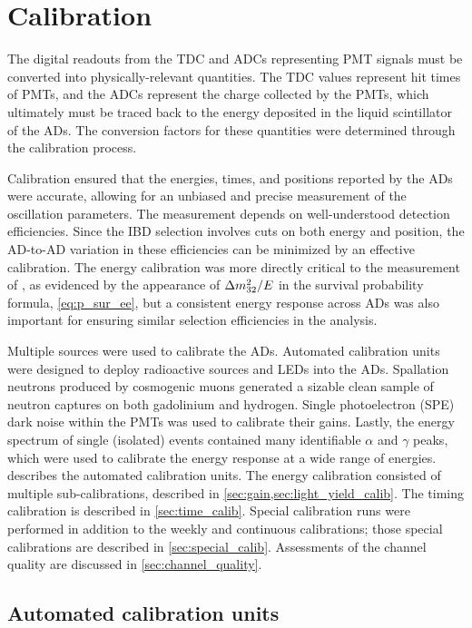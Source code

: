 \chapter{Calibration}
\label{ch:calibration}


The digital readouts from the TDC and ADCs representing PMT signals
must be converted into physically-relevant quantities.
The TDC values represent hit times of PMTs,
and the ADCs represent the charge collected by the PMTs,
which ultimately must be traced back to the energy deposited
in the liquid scintillator of the ADs.
The conversion factors for these quantities were determined
through the calibration process.

Calibration ensured that the energies, times, and positions
reported by the ADs were accurate,
allowing for an unbiased and precise measurement
of the oscillation parameters.
The \thetaot{} measurement depends on well-understood detection efficiencies.
Since the IBD selection involves cuts on both energy and position,
the AD-to-AD variation in these efficiencies can be minimized
by an effective calibration.
The energy calibration was more directly critical to the measurement
of \dmsquared{}, as evidenced by the appearance of $\Delta m^2_{32}/E$
in the survival probability formula, \cref{eq:p_sur_ee},
but a consistent energy response across ADs
was also important for ensuring similar selection efficiencies
in the \thetaot{} analysis.

Multiple sources were used to calibrate the ADs.
Automated calibration units were designed to deploy radioactive sources
and LEDs into the ADs.
Spallation neutrons produced by cosmogenic muons
generated a sizable clean sample of neutron captures
on both gadolinium and hydrogen.
Single photoelectron (SPE) dark noise within the PMTs
was used to calibrate their gains.
Lastly, the energy spectrum of single (isolated) events
contained many identifiable $\alpha$ and $\gamma$ peaks,
which were used to calibrate the energy response at a wide range of energies.
 describes the automated calibration units.
The energy calibration consisted of multiple sub-calibrations,
described in \cref{sec:gain,sec:light_yield_calib}.
The timing calibration is described in \cref{sec:time_calib}.
Special calibration runs were performed in addition to
the weekly and continuous calibrations;
those special calibrations are described in \cref{sec:special_calib}.
Assessments of the channel quality are discussed in \cref{sec:channel_quality}.

\section{Automated calibration units}
\label{sec:acus}

